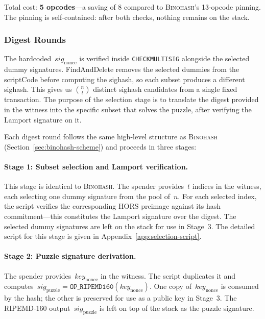 \documentclass[11pt, a4paper]{article}
\begin{document}
\noindent Total cost: \textbf{5 opcodes}---a saving of 8 compared to \textsc{Binohash}'s 13-opcode pinning. The pinning is self-contained: after both checks, nothing remains on the stack.

\subsubsection{Digest Rounds}
\label{sec:qs-rounds}

The hardcoded~$\mathit{sig}_{\mathrm{nonce}}$ is verified inside \texttt{CHECKMULTISIG} alongside the selected dummy signatures. FindAndDelete removes the selected dummies from the scriptCode before computing the sighash, so each subset produces a different sighash. This gives us $\binom{n}{t}$ distinct sighash candidates from a single fixed transaction. The purpose of the selection stage is to translate the digest provided in the witness into the specific subset that solves the puzzle, after verifying the Lamport signature on it.

Each digest round follows the same high-level structure as \textsc{Binohash} (Section~\ref{sec:binohash-scheme}) and proceeds in three stages:

\paragraph{Stage 1: Subset selection and Lamport verification.}
This stage is identical to \textsc{Binohash}. The spender provides~$t$ indices in the witness, each selecting one dummy signature from the pool of~$n$. For each selected index, the script verifies the corresponding HORS preimage against its hash commitment---this constitutes the Lamport signature over the digest. The selected dummy signatures are left on the stack for use in Stage~3. The detailed script for this stage is given in Appendix~\ref{app:selection-script}.

\paragraph{Stage 2: Puzzle signature derivation.}
The spender provides~$\mathit{key}_{\mathrm{nonce}}$ in the witness. The script duplicates it and computes~$\mathit{sig}_{\mathrm{puzzle}} = \texttt{OP\_RIPEMD160}(\mathit{key}_{\mathrm{nonce}})$. One copy of~$\mathit{key}_{\mathrm{nonce}}$ is consumed by the hash; the other is preserved for use as a public key in Stage~3. The RIPEMD-160 output~$\mathit{sig}_{\mathrm{puzzle}}$ is left on top of the stack as the puzzle signature.
\end{document}
